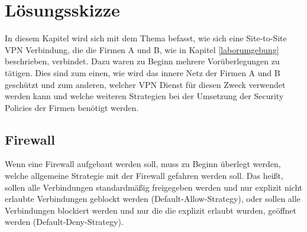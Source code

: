 \section{Lösungsskizze}\label{loesungsskizze}
In diesem Kapitel wird sich mit dem Thema befasst, wie sich eine Site-to-Site VPN Verbindung, die die Firmen A und B, wie in Kapitel \ref{laborumgebung} beschrieben, verbindet.
Dazu waren zu Beginn mehrere Vorüberlegungen zu tätigen. Dies sind zum einen, wie wird das innere Netz der Firmen A und B geschützt und zum anderen, welcher VPN Dienst für diesen Zweck verwendet werden kann und welche weiteren Strategien bei der Umsetzung der Security Policies der Firmen benötigt werden. 
\subsection{Firewall}\label{firewallloesung}
Wenn eine Firewall aufgebaut werden soll, muss zu Beginn überlegt werden, welche allgemeine Strategie mit der Firewall gefahren werden soll. Das heißt, sollen alle Verbindungen standardmäßig freigegeben werden und nur explizit nicht erlaubte Verbindungen geblockt werden (Default-Allow-Strategy), oder sollen alle Verbindungen blockiert werden und nur die die explizit erlaubt wurden, geöffnet werden (Default-Deny-Strategy). 

